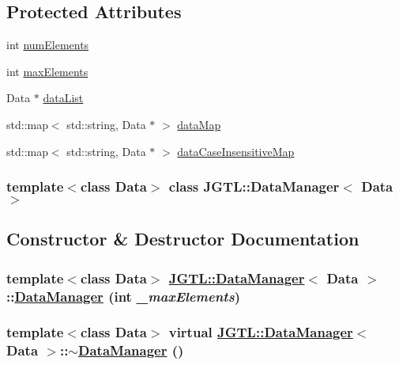 \subsection*{Protected Attributes}
\begin{CompactItemize}
\item 
int \hyperlink{class_j_g_t_l_1_1_data_manager_8819d3a793123ef49ee07bb11302af71}{num\-Elements}
\item 
int \hyperlink{class_j_g_t_l_1_1_data_manager_aa1a49e57505b0542e99dbaeda22b2e9}{max\-Elements}
\item 
Data $\ast$ \hyperlink{class_j_g_t_l_1_1_data_manager_2b20ba5251d89c1daeb92f4566c3d8cc}{data\-List}
\item 
std::map$<$ std::string, Data $\ast$ $>$ \hyperlink{class_j_g_t_l_1_1_data_manager_871994eebcabe5b6c8f4565561d09004}{data\-Map}
\item 
std::map$<$ std::string, Data $\ast$ $>$ \hyperlink{class_j_g_t_l_1_1_data_manager_a4e97afca438785863a86a20898130b0}{data\-Case\-Insensitive\-Map}
\end{CompactItemize}
\subsubsection*{template$<$class Data$>$ class JGTL::Data\-Manager$<$ Data $>$}



\subsection{Constructor \& Destructor Documentation}
\hypertarget{class_j_g_t_l_1_1_data_manager_ad25adf4d2c94622679097e1213d835c}{
\subsubsection[DataManager]{\setlength{\rightskip}{0pt plus 5cm}template$<$class Data$>$ \hyperlink{class_j_g_t_l_1_1_data_manager}{JGTL::Data\-Manager}$<$ Data $>$::\hyperlink{class_j_g_t_l_1_1_data_manager}{Data\-Manager} (int {\em \_\-max\-Elements})}}
\label{class_j_g_t_l_1_1_data_manager_ad25adf4d2c94622679097e1213d835c}


\hypertarget{class_j_g_t_l_1_1_data_manager_6055cf850702d6462aeaf05e0705d060}{
\subsubsection[$\sim$DataManager]{\setlength{\rightskip}{0pt plus 5cm}template$<$class Data$>$ virtual \hyperlink{class_j_g_t_l_1_1_data_manager}{JGTL::Data\-Manager}$<$ Data $>$::$\sim$\hyperlink{class_j_g_t_l_1_1_data_manager}{Data\-Manager} ()}}
\label{class_j_g_t_l_1_1_data_manager_6055cf850702d6462aeaf05e0705d060}




